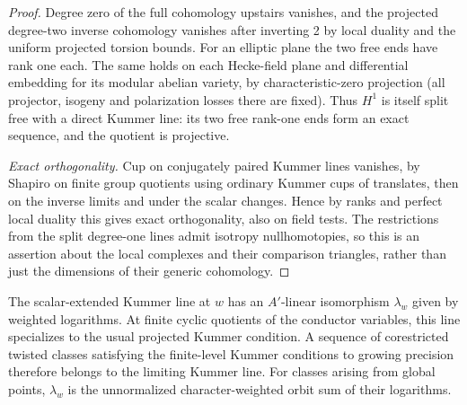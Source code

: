 \begin{proof}
Degree zero of the full cohomology upstairs vanishes, and the projected degree-two inverse cohomology vanishes after inverting 2 by local duality and the uniform projected torsion bounds. For an elliptic plane the two free ends have rank one each. The same holds on each Hecke-field plane and differential embedding for its modular abelian variety, by characteristic-zero projection (all projector, isogeny and polarization losses there are fixed). Thus \(H^1\) is itself split free with a direct Kummer line: its two free rank-one ends form an exact sequence, and the quotient is projective.

\smallskip\noindent\emph{Exact orthogonality.}
Cup on conjugately paired Kummer lines vanishes, by Shapiro on finite group quotients using ordinary Kummer cups of translates, then on the inverse limits and under the scalar changes. Hence by ranks and perfect local duality this gives exact orthogonality, also on field tests. The restrictions from the split degree-one lines admit isotropy nullhomotopies, so this is an assertion about the local complexes and their comparison triangles, rather than just the dimensions of their generic cohomology.
\end{proof}

\begin{lemma}\label{split-local:log-transfer}
The scalar-extended Kummer line at \(w\) has an \(A'\)-linear isomorphism \(\lambda_w\) given by weighted logarithms. At finite cyclic quotients of the conductor variables, this line specializes to the usual projected Kummer condition. A sequence of corestricted twisted classes satisfying the finite-level Kummer conditions to growing precision therefore belongs to the limiting Kummer line. For classes arising from global points, \(\lambda_w\) is the unnormalized character-weighted orbit sum of their logarithms.
\end{lemma}

